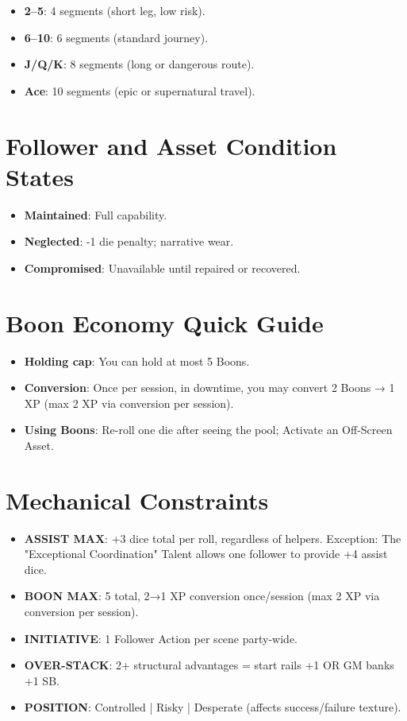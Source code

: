 \begin{itemize}
    \item \textbf{2--5}: 4 segments (short leg, low risk).
    \item \textbf{6--10}: 6 segments (standard journey).
    \item \textbf{J/Q/K}: 8 segments (long or dangerous route).
    \item \textbf{Ace}: 10 segments (epic or supernatural travel).
\end{itemize}

\section*{Follower and Asset Condition States}

\begin{itemize}
    \item \textbf{Maintained}: Full capability.
    \item \textbf{Neglected}: -1 die penalty; narrative wear.
    \item \textbf{Compromised}: Unavailable until repaired or recovered.
\end{itemize}

\section*{Boon Economy Quick Guide}

\begin{itemize}
    \item \textbf{Holding cap}: You can hold at most 5 Boons.
    \item \textbf{Conversion}: Once per session, in downtime, you may convert 2 Boons → 1 XP (max 2 XP via conversion per session).
    \item \textbf{Using Boons}: Re-roll one die after seeing the pool; Activate an Off-Screen Asset.
\end{itemize}

\section*{Mechanical Constraints}

\begin{itemize}
    \item \textbf{ASSIST MAX}: +3 dice total per roll, regardless of helpers. Exception: The "Exceptional Coordination" Talent allows one follower to provide +4 assist dice.
    \item \textbf{BOON MAX}: 5 total, 2→1 XP conversion once/session (max 2 XP via conversion per session).
    \item \textbf{INITIATIVE}: 1 Follower Action per scene party-wide.
    \item \textbf{OVER-STACK}: 2+ structural advantages = start rails +1 OR GM banks +1 SB.
    \item \textbf{POSITION}: Controlled | Risky | Desperate (affects success/failure texture).
\end{itemize}

